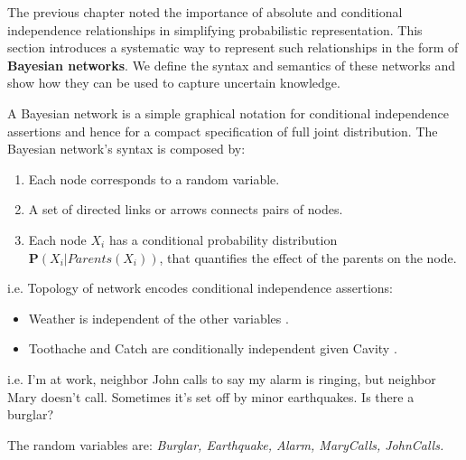 The previous chapter noted the importance of absolute and conditional independence relationships in simplifying probabilistic representation.
This section introduces a systematic way to represent such relationships in the form of \textbf{Bayesian networks}.
We define the syntax and semantics of these networks and show how they can be used to capture uncertain knowledge. \vspace{7pt}

A Bayesian network is a simple graphical notation for conditional independence assertions and hence for a compact specification of full joint distribution.
The Bayesian network's syntax is composed by:
\begin{enumerate}
    \item Each node corresponds to a random variable.
    \item A set of directed links or arrows connects pairs of nodes.
    \item Each node $X_i$ has a conditional probability distribution $\mathbf{P}(X_i|Parents(X_i))$, that quantifies the effect of the parents on the node.
\end{enumerate}
\begin{example}
    i.e. Topology of network encodes conditional independence assertions:
    \begin{center}
    \end{center}
    \begin{itemize}
        \renewcommand{\labelitemi}{-}
        \item Weather is independent of the other variables .
        \item Toothache and Catch are conditionally independent given Cavity .
    \end{itemize}
\end{example}
\begin{example}
    i.e. I'm at work, neighbor John calls to say my alarm is ringing, but neighbor Mary doesn't call. Sometimes it's set off by minor earthquakes. Is there a burglar? \vspace{3.5pt}

    The random variables are: \it Burglar, Earthquake, Alarm, MaryCalls, JohnCalls.
    \begin{center}
    \end{center}
\end{example}